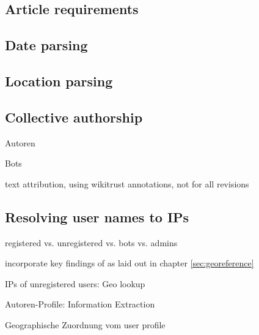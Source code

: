 \subsection{Article requirements}


\subsection{Date parsing}



\subsection{Location parsing}


\subsection{Collective authorship}


\begin{todos}
    \item Autoren
    \item Bots
    \item text attribution, using wikitrust annotations, not for all revisions
\end{todos}



\subsection{Resolving user names to IPs}

\begin{todos}
    \item registered vs. unregistered vs. bots vs. admins
    \item incorporate key findings of \cite{hardy2011volunteered} as laid out in chapter \ref{sec:georeference}
    \item IPs of unregistered users: Geo lookup
    \item Autoren-Profile: Information Extraction
    \item Geographische Zuordnung vom user profile
\end{todos}

